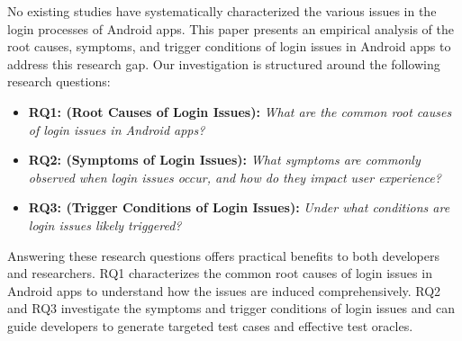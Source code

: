 No existing studies have systematically characterized the various issues in the login processes of Android apps. This paper presents an empirical analysis of the root causes, symptoms, and trigger conditions of login issues in Android apps to address this research gap. 
Our investigation is structured around the following research questions:
\begin{itemize}
    \item \textbf{RQ1: (Root Causes of Login Issues):}  \textit{What are the common root causes of login issues in Android apps?}
    
    \item \textbf{RQ2: (Symptoms of Login Issues):} \textit{What symptoms are commonly observed when login issues occur, and how do they impact user experience?}
    
    \item \textbf{RQ3: (Trigger Conditions of Login Issues):} \textit{Under what conditions are login issues likely triggered?}
\end{itemize}

Answering these research questions offers practical benefits to both developers and researchers.
RQ1 characterizes the common root causes of login issues in Android apps to understand how the issues are induced comprehensively. RQ2 and RQ3 investigate the symptoms and trigger conditions of login issues and can guide developers to generate targeted test cases and effective test oracles.

